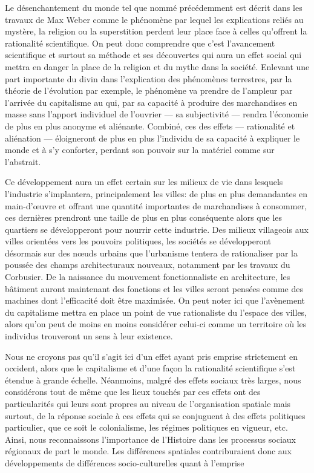 Le désenchantement du monde tel que nommé précédemment est décrit dans les travaux de Max Weber comme le phénomène par lequel les explications reliés au mystère, la religion ou la superstition perdent leur place face à celles qu'offrent la rationalité scientifique. 
On peut donc comprendre que c'est l'avancement scientifique et surtout sa méthode et ses découvertes qui aura un effet social qui mettra en danger la place de la religion et du mythe dans la société. 
Enlevant une part importante du divin dans l'explication des phénomènes terrestres, par la théorie de l'évolution par exemple, le phénomène va prendre de l'ampleur par l'arrivée du capitalisme au  qui, par sa capacité à produire des marchandises en masse sans l'apport individuel de l'ouvrier --- sa subjectivité --- rendra l'économie de plus en plus anonyme et aliénante. 
Combiné, ces des effets --- rationalité et aliénation --- éloigneront de plus en plus l'individu de sa capacité à expliquer le monde et à s'y conforter, perdant son pouvoir sur la matériel comme sur l'abstrait.

Ce développement aura un effet certain sur les milieux de vie dans lesquels l'industrie s'implantera, principalement les villes: de plus en plus demandantes en main-d’œuvre et offrant une quantité importantes de marchandises à consommer, ces dernières prendront une taille de plus en plus conséquente alors que les quartiers se développeront pour nourrir cette industrie. 
Des milieux villageois aux villes orientées vers les pouvoirs politiques, les sociétés se développeront désormais sur des nœuds urbains que l'urbanisme tentera de rationaliser par la poussée des champs architecturaux nouveaux, notamment par les travaux du Corbusier. 
De la naissance du mouvement fonctionnaliste en architecture, les bâtiment auront maintenant des fonctions et les villes seront pensées comme des machines dont l'efficacité doit être maximisée\missref{}. 
On peut noter ici que l'avènement du capitalisme mettra en place un point de vue rationaliste du l'espace des villes, alors qu'on peut de moins en moins considérer celui-ci comme un territoire où les individus trouveront un sens à leur existence.

Nous ne croyons pas qu'il s'agit ici d'un effet ayant pris emprise strictement en occident, alors que le capitalisme et d'une façon la rationalité scientifique s'est étendue à grande échelle. 
Néanmoins, malgré des effets sociaux très larges, nous considérons tout de même que les lieux touchés par ces effets ont des particularités qui leurs sont propres au niveau de l'organisation spatiale mais surtout, de la réponse sociale à ces effets qui se conjuguent à des effets politiques particulier, que ce soit le colonialisme, les régimes politiques en vigueur, etc. 
Ainsi, nous reconnaissons l'importance de l'Histoire dans les processus sociaux régionaux de part le monde. 
Les différences spatiales contriburaient donc aux développements de différences socio-culturelles quant à l'emprise 



